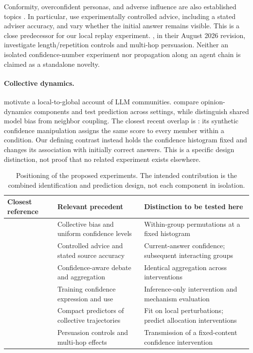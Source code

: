 \documentclass[11pt]{article}
\begin{document}
Conformity, overconfident personas, and adverse influence are also established topics \citep{weng2025benchform,zhang2024collaboration,amayuelas2024attack}. In particular, \citet{kumaran2025change} use experimentally controlled advice, including a stated adviser accuracy, and vary whether the initial answer remains visible. This is a close predecessor for our local replay experiment. \citet{zhao2025persuasion}, in their August 2026 revision, investigate length/repetition controls and multi-hop persuasion. Neither an isolated confidence-number experiment nor propagation along an agent chain is claimed as a standalone novelty.

\paragraph{Collective dynamics.}
\citet{el2026physics} motivate a local-to-global account of LLM communities. \citet{probine2026opinion} compare opinion-dynamics components and test prediction across settings, while \citet{denobili2026alignment} distinguish shared model bias from neighbor coupling. The closest recent overlap is \citet{okawa2026biased}: its synthetic confidence manipulation assigns the same score to every member within a condition. Our defining contrast instead holds the confidence histogram fixed and changes its association with initially correct answers. This is a specific design distinction, not proof that no related experiment exists elsewhere.

\begin{table}[t]
\centering\small
\begin{tabularx}{\linewidth}{@{}p{.25\linewidth}YY@{}}
\toprule
Closest reference & Relevant precedent & Distinction to be tested here \\
\midrule
\citet{okawa2026biased} & Collective bias and uniform confidence levels & Within-group permutations at a fixed histogram \\
\citet{kumaran2025change} & Controlled advice and stated source accuracy & Current-answer confidence; subsequent interacting groups \\
\citet{lin2025confmad} & Confidence-aware debate and aggregation & Identical aggregation across interventions \\
\citet{zhu2026demystifying} & Training confidence expression and use & Inference-only intervention and mechanism evaluation \\
\citet{el2026physics,probine2026opinion} & Compact predictors of collective trajectories & Fit on local perturbations; predict allocation interventions \\
\citet{zhao2025persuasion} & Persuasion controls and multi-hop effects & Transmission of a fixed-content confidence intervention \\
\bottomrule
\end{tabularx}
\caption{Positioning of the proposed experiments. The intended contribution is the combined identification and prediction design, not each component in isolation.}
\label{tab:related}
\end{table}
\end{document}
